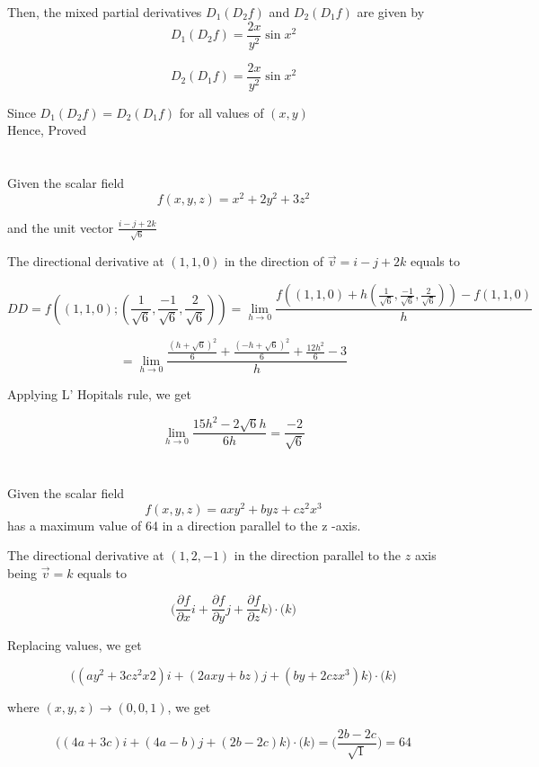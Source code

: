 \documentclass[11pt]{article}
\begin{document}
Then, the mixed partial derivatives $D_{1}(D_{2}f)$ and $D_{2}(D_{1}f)$ are given by
$$D_{1}(D_{2}f) = \frac{2x}{y^{2}}\sin{x^{2}}$$

$$D_{2}(D_{1}f) = \frac{2x}{y^{2}}\sin{x^{2}}$$

Since $D_{1}(D_{2}f) = D_{2}(D_{1}f)$ for all values of $(x,y)$
\\
Hence, Proved

\section{}

Given the scalar field $$f(x,y,z) = x^{2} + 2y^{2} + 3z^{2}$$

and the unit vector $\frac{i - j + 2k}{\sqrt{6}}$

The directional derivative at $(1, 1, 0)$ in the direction of $\vec{v} = i - j + 2k$ equals to

$$DD = f((1,1,0);(\frac{1}{\sqrt{6}}, \frac{-1}{\sqrt{6}}, \frac{2}{\sqrt{6}})) = \lim_{h\to0}\frac{f((1,1,0) + h(\frac{1}{\sqrt{6}}, \frac{-1}{\sqrt{6}}, \frac{2}{\sqrt{6}})) - f(1,1,0)}{h}$$

$$= \lim_{h\to0}\frac{\frac{(h + \sqrt{6})^{2}}{6} + \frac{(-h + \sqrt{6})^{2}}{6} + \frac{12h^{2}}{6} - 3}{h}$$

Applying L' Hopitals rule, we get

$$\lim_{h\to0}\frac{15h^{2} - 2\sqrt{6}h}{6h} = \frac{-2}{\sqrt{6}}$$



\section{}

Given the scalar field $$f(x,y,z) = axy^{2} + byz + cz^{2}x^{3}$$
  has a maximum value of 64 in a direction parallel
to the z -axis.

The directional derivative at $(1, 2, −1)$ in the direction parallel to the $z$ axis being $\vec{v} = k$ equals to

$${\Big(\frac{\partial f}{\partial x}i + \frac{\partial f}{\partial y}j + \frac{\partial f}{\partial z}k}\Big)\cdot\big({k}\big)$$

Replacing values, we get

$$\Big((ay^{2} + 3cz^{2}x{2})i + (2axy + bz)j + (by + 2czx^{3})k\Big)\cdot\big({k}\big)$$

where $(x,y,z) \rightarrow (0,0,1)$, we get

$$\Big((4a + 3c)i + (4a - b)j + (2b - 2c)k\Big)\cdot\big({k}\big) = \big(\frac{2b - 2c}{\sqrt{1}}\big) = 64$$
\end{document}
